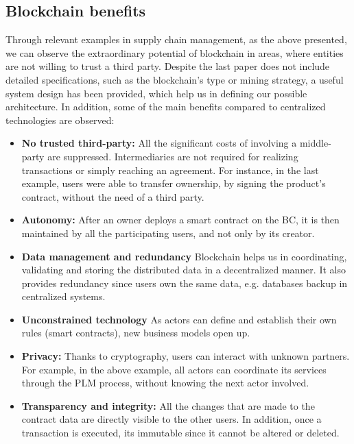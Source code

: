 \subsection{Blockchain benefits}

Through relevant examples in supply chain management, as the above presented, we can observe the extraordinary potential of blockchain in areas, where entities are not willing to trust a third party. Despite the last paper does not include detailed specifications, such as the blockchain's type or mining strategy, a useful system design has been provided, which help us in defining our possible architecture. In addition, some of the main benefits compared to centralized technologies are observed:

\begin{itemize}
	\item \textbf{No trusted third-party:} All the significant costs of involving a middle-party are suppressed\citep{mainelli2015sharing}. Intermediaries are not required for realizing transactions or simply reaching an agreement. For instance, in the last example, users were able to transfer ownership, by signing the product's contract, without the need of a third party.
	\item \textbf{Autonomy:} After an owner deploys a smart contract on the BC, it is then maintained by all the participating users, and not only by its creator.
	\item \textbf{Data management and redundancy} Blockchain helps us in coordinating, validating and storing the distributed data in a decentralized manner. It also provides redundancy since users own the same data, e.g. databases backup in centralized systems. 
	\item \textbf{Unconstrained technology} As actors can define and establish their own rules (smart contracts), new business models open up.
	\item \textbf{Privacy:} Thanks to cryptography, users can interact with unknown partners. For example, in the above example, all actors can coordinate its services through the PLM process, without knowing the next actor involved. 
    \item \textbf{Transparency and integrity:} All the changes that are made to the contract data are directly visible to the other users. In addition, once a transaction is executed, its immutable since it cannot be altered or deleted.
	
\end{itemize}

